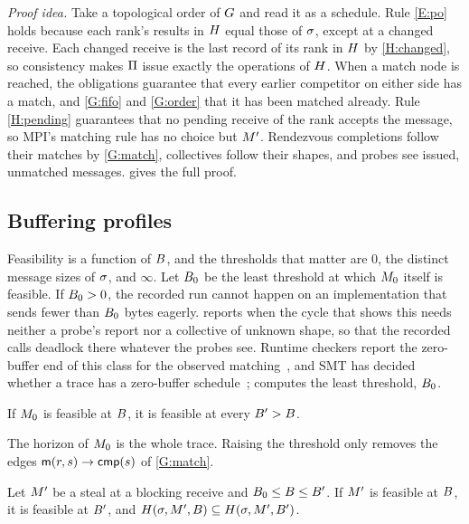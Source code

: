 \noindent\emph{Proof idea.} Take a topological order of $G$ and read it as a
schedule. Rule \ref{E:po} holds because each rank's results in $H$ equal those of
$\sigma$, except at a changed receive. Each changed receive is the last record of its
rank in $H$ by \ref{H:changed}, so consistency makes $\Pi$ issue exactly the
operations of $H$. When a match node is reached, the obligations guarantee that every
earlier competitor on either side has a match, and \ref{G:fifo} and \ref{G:order} that it
has been matched already. Rule
\ref{H:pending} guarantees that no pending receive of the rank accepts the message, so
MPI's matching rule has no choice but $M'$. Rendezvous completions follow their
matches by \ref{G:match}, collectives follow their shapes, and probes see issued,
unmatched messages.  gives the full proof.

\subsection{Buffering profiles}
\label{sec:buffering}

Feasibility is a function of $B$, and the thresholds that matter are $0$, the distinct
message sizes of $\sigma$, and $\infty$. Let $B_0$ be the least threshold at which
$M_0$ itself is feasible. If $B_0>0$, the recorded run cannot happen on an implementation
that sends fewer than $B_0$ bytes eagerly. \tool reports  when the cycle
that shows this needs neither a probe's report nor a collective of unknown shape, so that the
recorded calls deadlock there whatever the probes see. Runtime checkers report the zero-buffer
end of this class for the observed matching~\citep{vetter00umpire,hilbrich12must}, and SMT
has decided whether a trace has a zero-buffer schedule~\citep{huang15nfm}; \tool computes the
least threshold, $B_0$.

\begin{lemma}
\label{lem:obsmono}
If $M_0$ is feasible at $B$, it is feasible at every $B'>B$.
\end{lemma}
\noindent The horizon of $M_0$ is the whole trace. Raising the threshold only removes
the edges $\mathsf{m}(r,s)\to\mathsf{cmp}(s)$ of \ref{G:match}.

\begin{theorem}[Monotonicity]
\label{thm:mono}
Let $M'$ be a steal at a blocking receive and $B_0\le B\le B'$. If $M'$ is feasible
at $B$, it is feasible at $B'$, and $H(\sigma,M',B)\subseteq H(\sigma,M',B')$.
\end{theorem}

